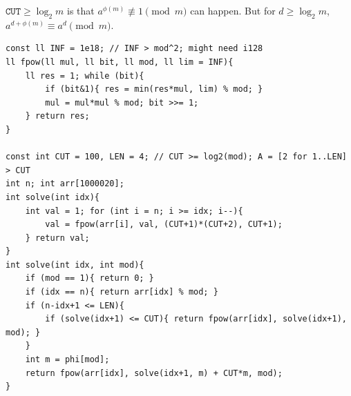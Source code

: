 $\mathtt{CUT} \ge \log_2 m$ is that $a^{\phi(m)} \not\equiv 1 \pmod m$ can happen. But for $d \ge \log_2 m$, $a^{d+\phi(m)} \equiv a^{d} \pmod m$.
\begin{verbatim}
const ll INF = 1e18; // INF > mod^2; might need i128
ll fpow(ll mul, ll bit, ll mod, ll lim = INF){
	ll res = 1; while (bit){
		if (bit&1){ res = min(res*mul, lim) % mod; }
		mul = mul*mul % mod; bit >>= 1;
	} return res;
}

const int CUT = 100, LEN = 4; // CUT >= log2(mod); A = [2 for 1..LEN] > CUT
int n; int arr[1000020];
int solve(int idx){
	int val = 1; for (int i = n; i >= idx; i--){
		val = fpow(arr[i], val, (CUT+1)*(CUT+2), CUT+1);
	} return val;
}
int solve(int idx, int mod){
	if (mod == 1){ return 0; }
	if (idx == n){ return arr[idx] % mod; }
	if (n-idx+1 <= LEN){
		if (solve(idx+1) <= CUT){ return fpow(arr[idx], solve(idx+1), mod); }
	}
	int m = phi[mod];
	return fpow(arr[idx], solve(idx+1, m) + CUT*m, mod);
}
\end{verbatim}